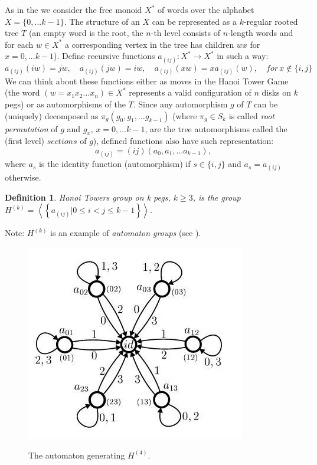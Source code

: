 \documentclass[a4paper,12pt]{amsart}
\newtheorem{definition}{Definition}
\begin{document}
As in the \cite{Hanoi2} we consider the free monoid $X^*$ of words over the alphabet $X = \{0,... k-1\}$.
The structure of an $X$ can be represented as a $k$-regular rooted tree $T$ (an empty word is the root,
the $n$-th level consists of $n$-length words and for each $w \in X^*$ a corresponding vertex in the
tree has children $w x$ for $x = 0, ... k-1$). Define recursive functions
$a_{(ij)} : X^* \rightarrow X^*$ in such a way:
$$
a_{(ij)}(iw) = jw, \quad a_{(ij)}(jw) = iw, \quad a_{(ij)}(xw) = xa_{(ij)}(w), \quad for \, x \notin \{i, j\}
$$
We can think about these functions either as moves in the Hanoi Tower Game (the word
$(w = x_1 x_2... x_n) \in X^*$ represents a valid configuration of $n$ disks on $k$ pegs)
or as automorphisms of the $T$. Since any automorphism $g$ of $T$ can be (uniquely)
decomposed as $\pi_g (g_0, g_1, ... g_{k-1})$ (where $\pi_g \in S_{k}$ is called
\textit{root permutation} of $g$ and $g_x, \, x = 0, ... k-1$, are the tree automorphisms
called the (first level) $sections$ of $g$), defined functions also have such representation:
$$
a_{(ij)} = (i j) (a_0, a_1, ... a_{k-1}),
$$
where $a_s$ is the identity function (automorphism) if $s \in \{i, j\}$ and $a_s = a_{(ij)}$ otherwise.
\\

\begin{definition}
\textit{Hanoi Towers group on k pegs}, $k \ge 3$, is the group
$H^{(k)} = \left\langle \left\{ a_{(ij)} | 0 \le i < j \le k - 1 \right\}\right\rangle$.
\end{definition}

Note: $H^{(k)}$ is an example of \textit{automaton groups} (see \cite{Auto}).

\begin{figure}[h]
	\centering
	\includegraphics[scale=0.4]{../graphs/automaton_h4.jpg}
	\label{automaton}
	\caption{The automaton generating $H^{(4)}$.}

\end{figure}
\end{document}
